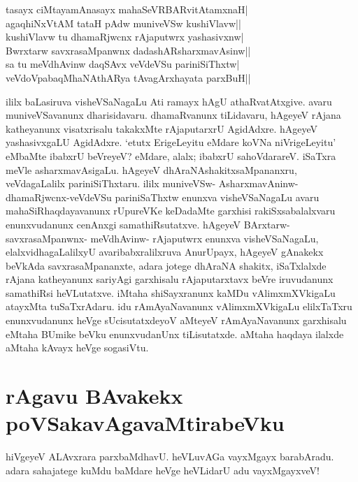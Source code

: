 \begin{shloka}
tasayx ciMtayamAnasayx mahaSeVRBARvitAtamxnaH|\\
agaqhiNxVtAM tataH pAdw muniveVSw kushiVlavw||\\
kushiVlavw tu dhamaRjwcnx rAjaputwrx yashasivxnw|\label{240}\\
Bwrxtarw savxrasaMpanwnx dadashARsharxmavAsinw||\\
sa tu meVdhAvinw daqSAvx veVdeVSu pariniSiThxtw|\label{240a}\\
veVdoVpabaqMhaNAthARya tAvagArxhayata parxBuH||
\end{shloka}

ililx baLasiruva visheVSaNagaLu Ati ramayx hAgU athaRvatAtxgive. avaru muniveVSavanunx dharisidavaru. dhamaRvanunx tiLidavaru, hAgeyeV rAjana katheyanunx visatxrisalu takakxMte rAjaputarxrU AgidAdxre. hAgeyeV yashasivxgaLU AgidAdxre. `etutx ErigeLeyitu eMdare koVNa niVrigeLeyitu' eMbaMte ibabxrU beVreyeV? eMdare, alalx; ibabxrU sahoVdarareV. iSaTxra meVle asharxmavAsigaLu. hAgeyeV dhAraNAshakitxsaMpananxru, veVdagaLalilx pariniSiThxtaru. ililx muniveVSw- AsharxmavAninw-dhamaRjwcnx-veVdeVSu pariniSaThxtw enunxva visheVSaNagaLu avaru mahaSiRhaqdayavanunx rUpureVKe keDadaMte garxhisi rakiSxsabalalxvaru enunxvudanunx cenAnxgi samathiRsutatxve. hAgeyeV BArxtarw-savxrasaMpanwnx- meVdhAvinw- rAjaputwrx enunxva visheVSaNagaLu, elalxvidhagaLalilxyU avaribabxralilxruva AnurUpayx, hAgeyeV gAnakekx beVkAda savxrasaMpananxte, adara jotege dhAraNA shakitx, iSaTxlalxde rAjana katheyanunx sariyAgi garxhisalu rAjaputarxtavx beVre iruvudanunx samathiRsi heVLutatxve. iMtaha shiSayxranunx kaMDu vAlimxmXVkigaLu atayxMta tuSaTxrAdaru. idu rAmAyaNavanunx  vAlimxmXVkigaLu elilxTaTxru enunxvudanunx heVge sUcisutatxdeyoV aMteyeV rAmAyaNavanunx garxhisalu eMtaha BUmike beVku enunxvudanUnx tiLisutatxde. aMtaha haqdaya ilalxde aMtaha kAvayx heVge sogasiVtu. 

\section*{rAgavu BAvakekx poVSakavAgavaMtirabeVku}

hiVgeyeV ALAvxrara parxbaMdhavU. heVLuvAGa vayxMgayx barabAradu. adara sahajatege kuMdu baMdare heVge heVLidarU adu vayxMgayxveV!

